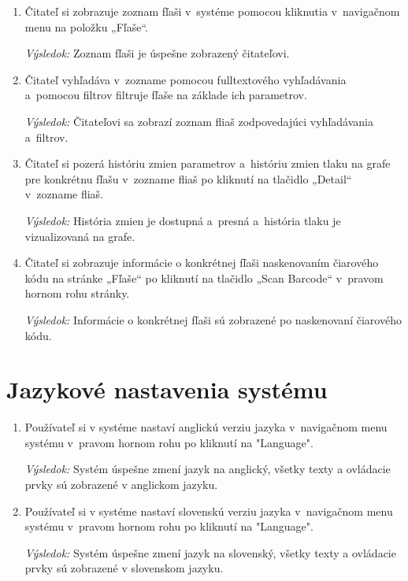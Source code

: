 \documentclass{zah}
\begin{document}
\begin{enumerate}
	\item Čitateľ si zobrazuje zoznam fľaši v systéme pomocou kliknutia v navigačnom menu na položku „Fľaše“.
	
	\textit{Výsledok:} Zoznam fľaši je úspešne zobrazený čitateľovi.
	
	\item Čitateľ vyhľadáva v zozname pomocou fulltextového vyhľadávania a pomocou filtrov filtruje fľaše na základe ich parametrov.
	
	\textit{Výsledok:} Čitateľovi sa zobrazí zoznam fliaš zodpovedajúci vyhľadávania a filtrov.
	
	\item Čitateľ si pozerá históriu zmien parametrov a históriu zmien tlaku na grafe pre konkrétnu fľašu v zozname fliaš po kliknutí na tlačidlo „Detail“ v zozname fliaš.
	
	\textit{Výsledok:} História zmien je dostupná a presná a história tlaku je vizualizovaná na grafe.
	
	\item Čitateľ si zobrazuje informácie o konkrétnej fľaši naskenovaním čiarového kódu na stránke „Fľaše“ po kliknutí na tlačidlo „Scan Barcode“ v pravom hornom rohu stránky.
	
	\textit{Výsledok:} Informácie o konkrétnej fľaši sú zobrazené po naskenovaní čiarového kódu.
\end{enumerate}

\section{Jazykové nastavenia systému}

\begin{enumerate}
	\item Používateľ si v systéme nastaví anglickú verziu jazyka v navigačnom menu systému v pravom hornom rohu po kliknutí na "Language".
		
	\textit{Výsledok:} Systém úspešne zmení jazyk na anglický, všetky texty a ovládacie prvky sú zobrazené v anglickom jazyku.
	
	\item Používateľ si v systéme nastaví slovenskú verziu jazyka v navigačnom menu systému v pravom hornom rohu po kliknutí na "Language".
		
	\textit{Výsledok:} Systém úspešne zmení jazyk na slovenský, všetky texty a ovládacie prvky sú zobrazené v slovenskom jazyku.
\end{enumerate}
\end{document}
